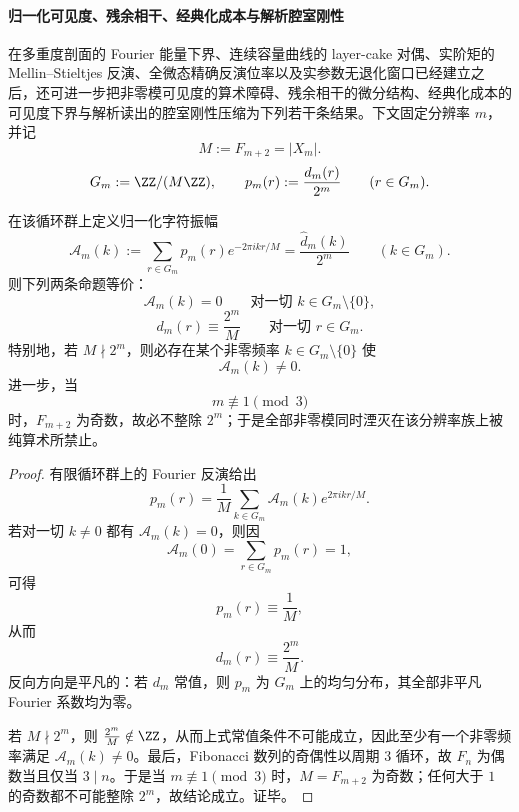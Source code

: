 \paragraph{归一化可见度、残余相干、经典化成本与解析腔室刚性}
在多重度剖面的 Fourier 能量下界、连续容量曲线的 layer-cake 对偶、实阶矩的 Mellin--Stieltjes 反演、全微态精确反演位率以及实参数无退化窗口已经建立之后，还可进一步把非零模可见度的算术障碍、残余相干的微分结构、经典化成本的可见度下界与解析读出的腔室刚性压缩为下列若干条结果。下文固定分辨率 \(m\)，并记
\[
M:=F_{m+2}=|X_m|.
\]
\[
G_m:=\ZZ/(M\ZZ),
\qquad
p_m(r):=\frac{d_m(r)}{2^m}
\qquad
(r\in G_m).
\]

\begin{theorem}[全模可见度同时湮灭的整除障碍]\label{thm:xi-time-part9m3-all-nonzero-visibility-extinction-divisibility-obstruction}
在该循环群上定义归一化字符振幅
\[
\mathcal A_m(k):=\sum_{r\in G_m}p_m(r)e^{-2\pi i kr/M}
=
\frac{\widehat d_m(k)}{2^m}
\qquad
(k\in G_m).
\]
则下列两条命题等价：
\[
\mathcal A_m(k)=0
\qquad
\text{对一切 }k\in G_m\setminus\{0\},
\]
\[
d_m(r)\equiv \frac{2^m}{M}
\qquad
\text{对一切 }r\in G_m.
\]
特别地，若 \(M\nmid 2^m\)，则必存在某个非零频率 \(k\in G_m\setminus\{0\}\) 使
\[
\mathcal A_m(k)\neq 0.
\]
进一步，当
\[
m\not\equiv 1\pmod 3
\]
时，\(F_{m+2}\) 为奇数，故必不整除 \(2^m\)；于是全部非零模同时湮灭在该分辨率族上被纯算术所禁止。
\end{theorem}
\begin{proof}
有限循环群上的 Fourier 反演给出
\[
p_m(r)=\frac1M\sum_{k\in G_m}\mathcal A_m(k)e^{2\pi i kr/M}.
\]
若对一切 \(k\neq 0\) 都有 \(\mathcal A_m(k)=0\)，则因
\[
\mathcal A_m(0)=\sum_{r\in G_m}p_m(r)=1,
\]
可得
\[
p_m(r)\equiv \frac1M,
\]
从而
\[
d_m(r)\equiv \frac{2^m}{M}.
\]
反向方向是平凡的：若 \(d_m\) 常值，则 \(p_m\) 为 \(G_m\) 上的均匀分布，其全部非平凡 Fourier 系数均为零。

若 \(M\nmid 2^m\)，则 \(\frac{2^m}{M}\notin\ZZ\)，从而上式常值条件不可能成立，因此至少有一个非零频率满足 \(\mathcal A_m(k)\neq 0\)。最后，Fibonacci 数列的奇偶性以周期 \(3\) 循环，故 \(F_n\) 为偶数当且仅当 \(3\mid n\)。于是当 \(m\not\equiv 1\pmod 3\) 时，\(M=F_{m+2}\) 为奇数；任何大于 \(1\) 的奇数都不可能整除 \(2^m\)，故结论成立。证毕。
\end{proof}

